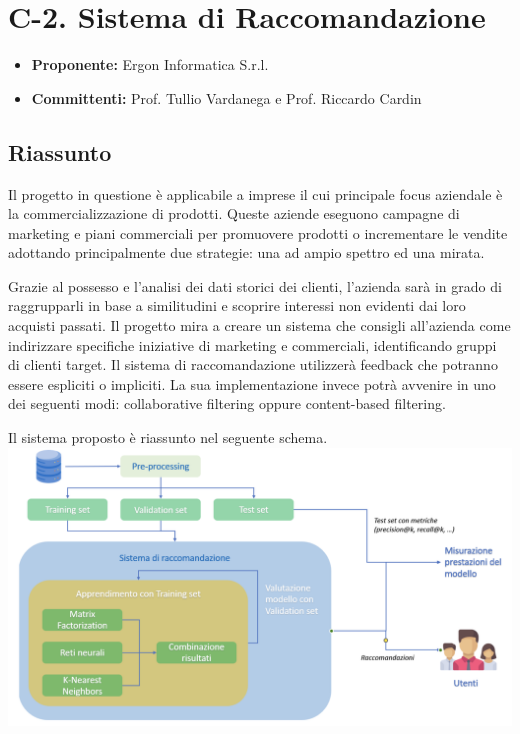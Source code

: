 \documentclass{article}
\begin{document}
\newpage
\section{C-2. Sistema di Raccomandazione}
\begin{itemize}
    \item \textbf{Proponente:} Ergon Informatica S.r.l.
    \item \textbf{Committenti:}  Prof. Tullio Vardanega e Prof. Riccardo Cardin
\end{itemize}

\subsection{Riassunto}
Il progetto in questione è applicabile a imprese il cui principale focus aziendale è la commercializzazione di prodotti. Queste aziende eseguono campagne di marketing e piani commerciali per promuovere prodotti o incrementare le vendite adottando principalmente due strategie: una ad ampio spettro ed una mirata.

Grazie al possesso e l’analisi dei dati storici dei clienti, l’azienda sarà in grado di raggrupparli in base a similitudini e scoprire interessi non evidenti dai loro acquisti passati.
Il progetto mira a creare un sistema che consigli all'azienda come indirizzare specifiche iniziative di marketing e commerciali, identificando gruppi di clienti target.
Il sistema di raccomandazione utilizzerà feedback che potranno essere espliciti o impliciti. La sua implementazione invece potrà avvenire in uno dei seguenti modi: collaborative filtering oppure content-based filtering.

Il sistema proposto è riassunto nel seguente schema.\\
\includegraphics[width=1\textwidth]{im_ERGON.png}
\end{document}
